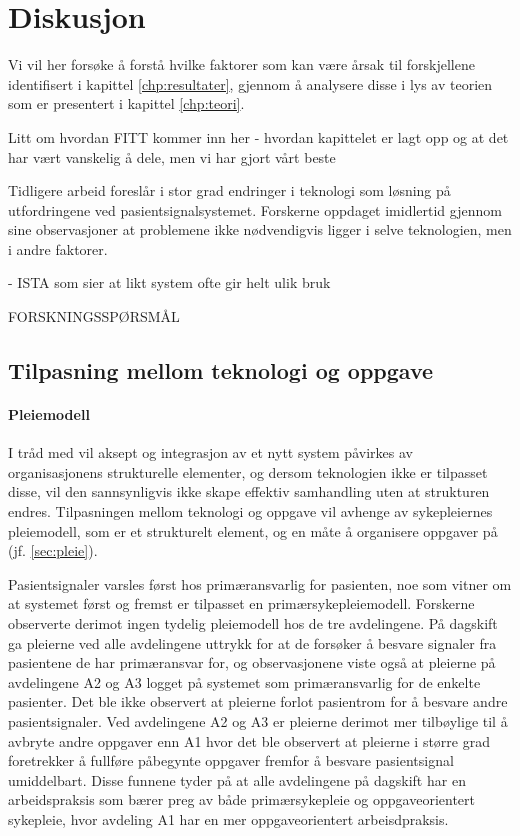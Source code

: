 \chapter{Diskusjon}
\label{chp:diskusjon}

Vi vil her forsøke å forstå hvilke faktorer som kan være årsak til forskjellene identifisert i kapittel \ref{chp:resultater}, gjennom å analysere disse i lys av teorien som er presentert i kapittel \ref{chp:teori}. 

Litt om hvordan FITT kommer inn her - hvordan kapittelet er lagt opp og at det har vært vanskelig å dele, men vi har gjort vårt beste

\noindent
Tidligere arbeid foreslår i stor grad endringer i teknologi som løsning på utfordringene ved pasientsignalsystemet. Forskerne oppdaget imidlertid gjennom sine observasjoner at problemene ikke nødvendigvis ligger i selve teknologien, men i andre faktorer. 

- ISTA som sier at likt system ofte gir helt ulik bruk

FORSKNINGSSPØRSMÅL

\section{Tilpasning mellom teknologi og oppgave}	

\subsubsection{Pleiemodell}	
I tråd med \citet{Orlikowski92} vil aksept og integrasjon av et nytt system påvirkes av organisasjonens strukturelle elementer, og dersom teknologien ikke er tilpasset disse, vil den sannsynligvis ikke skape effektiv samhandling uten at strukturen endres. 
Tilpasningen mellom teknologi og oppgave vil avhenge av sykepleiernes pleiemodell, som er et strukturelt element, og en måte å organisere oppgaver på (jf. \ref{sec:pleie}).

\noindent
Pasientsignaler varsles først hos primæransvarlig for pasienten, noe som vitner om at systemet først og fremst er tilpasset en primærsykepleiemodell. Forskerne observerte derimot ingen tydelig pleiemodell hos de tre avdelingene. På dagskift ga pleierne ved alle avdelingene uttrykk for at de forsøker å besvare signaler fra pasientene de har primæransvar for, og observasjonene viste også at pleierne på avdelingene A2 og A3 logget på systemet som primæransvarlig for de enkelte pasienter. Det ble ikke observert at pleierne forlot pasientrom for å besvare andre pasientsignaler. Ved avdelingene A2 og A3 er pleierne derimot mer tilbøylige til å avbryte andre oppgaver enn A1 hvor det ble observert at pleierne i større grad foretrekker å fullføre påbegynte oppgaver fremfor å besvare pasientsignal umiddelbart. Disse funnene tyder på at alle avdelingene på dagskift har en arbeidspraksis som bærer preg av både primærsykepleie og oppgaveorientert sykepleie, hvor avdeling A1 har en mer oppgaveorientert arbeisdpraksis.

